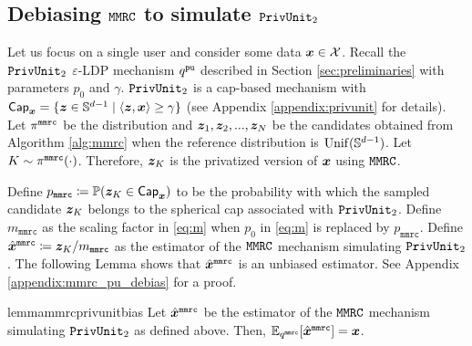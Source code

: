 \subsection{Debiasing \texorpdfstring{$\texttt{MMRC}$}{MMRC} to simulate \texorpdfstring{$\texttt{PrivUnit}_2$}{PrivUnit}}
\label{subsec:mmrc_privunit}

Let us focus on a single user and consider some data ${\boldsymbol{x}} \in \mathcal{X}$. Recall the $\texttt{PrivUnit}_2$ $\varepsilon$-LDP mechanism $q^{\texttt{pu}}$ described in Section \ref{sec:preliminaries} with parameters $p_0$ and $\gamma$. $\texttt{PrivUnit}_2$ is a cap-based mechanism with $\mathsf{Cap}_{{\boldsymbol{x}}} = \{{\boldsymbol{z}} \in \mathbb{S}^{d-1} \mid
\langle {\boldsymbol{z}}, {\boldsymbol{x}}  \rangle \ge \gamma\}$ (see Appendix \ref{appendix:privunit} for details).
Let $\pi^{\texttt{mmrc}}$ be the distribution and ${\boldsymbol{z}}_1, {\boldsymbol{z}}_2,...,{\boldsymbol{z}}_N$ be the candidates obtained from Algorithm \ref{alg:mmrc} when the reference distribution is $\mathrm{Unif}(\mathbb{S}^{d-1})$. Let  $K \sim \pi^{\texttt{mmrc}}(\cdot)$. Therefore, ${\boldsymbol{z}}_K$ is the privatized version of ${\boldsymbol{x}}$ using $\texttt{MMRC}$.

Define $p_{\texttt{mmrc}} \coloneqq \mathbb{P}({\boldsymbol{z}}_K \in \mathsf{Cap}_{{\boldsymbol{x}}})$
to be the probability with which the sampled candidate ${\boldsymbol{z}}_K$ belongs to the spherical cap associated with $\texttt{PrivUnit}_2$.
Define $m_{\texttt{mmrc}}$ as the scaling factor in \eqref{eq:m} when $p_0$ in \eqref{eq:m} is replaced by $p_{\texttt{mmrc}}$. Define $\hat{{\boldsymbol{x}}}^\texttt{mmrc} \coloneqq {\boldsymbol{z}}_K / m_\texttt{mmrc}$ as the estimator of the $\texttt{MMRC}$ mechanism simulating $\texttt{PrivUnit}_2$.  The following Lemma shows that $\hat{{\boldsymbol{x}}}^\texttt{mmrc}$ is an unbiased estimator. See Appendix \ref{appendix:mmrc_pu_debias} for a proof.

\begin{restatable}{lemma}{mmrcprivunitbias}\label{lemma:mmrc_privunit_bias}
Let $\hat{{\boldsymbol{x}}}^\texttt{mmrc}$ be the estimator of the \emph{$\texttt{MMRC}$} mechanism simulating \emph{$\texttt{PrivUnit}_2$} as defined above. Then, $\mathbb{E}_{q^{\texttt{mmrc}}}[\hat{{\boldsymbol{x}}}^\texttt{mmrc}] = {\boldsymbol{x}}$.
\end{restatable}




